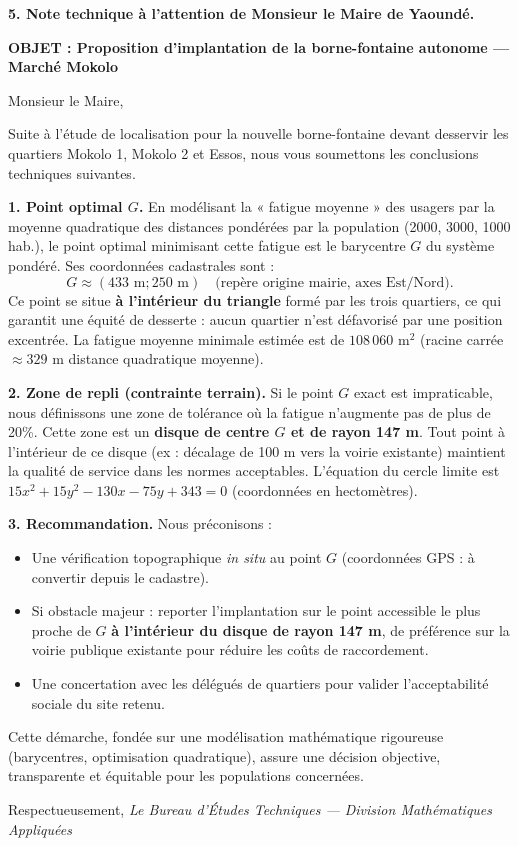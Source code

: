 \documentclass[11pt]{article}
\begin{document}
\begin{exoresolu}
\textbf{5. Note technique à l'attention de Monsieur le Maire de Yaoundé.}

\begin{center}
\textbf{OBJET : Proposition d'implantation de la borne-fontaine autonome — Marché Mokolo}
\end{center}

Monsieur le Maire,

Suite à l'étude de localisation pour la nouvelle borne-fontaine devant desservir les quartiers Mokolo 1, Mokolo 2 et Essos, nous vous soumettons les conclusions techniques suivantes.

\textbf{1. Point optimal $G$.}
En modélisant la « fatigue moyenne » des usagers par la moyenne quadratique des distances pondérées par la population (2000, 3000, 1000 hab.), le point optimal minimisant cette fatigue est le barycentre $G$ du système pondéré. Ses coordonnées cadastrales sont :
\[
G \approx (433 \text{ m} ; 250 \text{ m}) \quad \text{(repère origine mairie, axes Est/Nord)}.
\]
Ce point se situe \textbf{à l'intérieur du triangle} formé par les trois quartiers, ce qui garantit une équité de desserte : aucun quartier n'est défavorisé par une position excentrée. La fatigue moyenne minimale estimée est de $108\,060 \text{ m}^2$ (racine carrée $\approx 329 \text{ m}$ distance quadratique moyenne).

\textbf{2. Zone de repli (contrainte terrain).}
Si le point $G$ exact est impraticable, nous définissons une zone de tolérance où la fatigue n'augmente pas de plus de 20\%. Cette zone est un \textbf{disque de centre $G$ et de rayon 147 m}.
Tout point à l'intérieur de ce disque (ex : décalage de 100 m vers la voirie existante) maintient la qualité de service dans les normes acceptables. L'équation du cercle limite est $15x^2+15y^2-130x-75y+343=0$ (coordonnées en hectomètres).

\textbf{3. Recommandation.}
Nous préconisons :
\begin{itemize}
    \item Une vérification topographique \textit{in situ} au point $G$ (coordonnées GPS : à convertir depuis le cadastre).
    \item Si obstacle majeur : reporter l'implantation sur le point accessible le plus proche de $G$ \textbf{à l'intérieur du disque de rayon 147 m}, de préférence sur la voirie publique existante pour réduire les coûts de raccordement.
    \item Une concertation avec les délégués de quartiers pour valider l'acceptabilité sociale du site retenu.
\end{itemize}

Cette démarche, fondée sur une modélisation mathématique rigoureuse (barycentres, optimisation quadratique), assure une décision objective, transparente et équitable pour les populations concernées.

Respectueusement,
\textit{Le Bureau d'Études Techniques — Division Mathématiques Appliquées}
\end{exoresolu}
\end{document}
